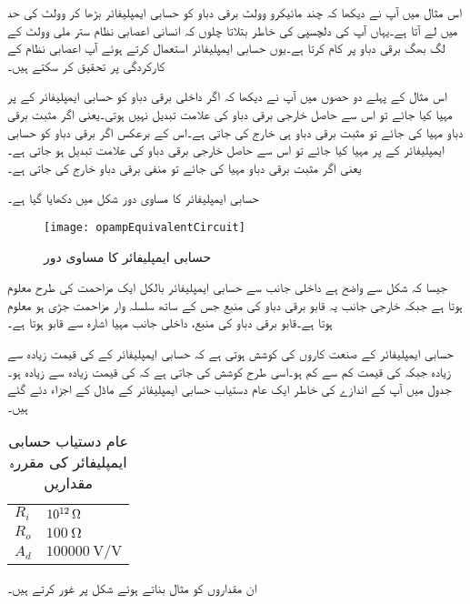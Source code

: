 
	اس مثال میں آپ نے دیکھا کہ چند مائیکرو وولٹ برقی دباو کو حسابی ایمپلیفائر بڑھا کر وولٹ کی حد میں لے آتا ہے۔یہاں آپ کی دلچسپی کی خاطر بتلاتا چلوں کہ انسانی اعصابی نظام  ستر ملی وولٹ  کے لگ بھگ برقی دباو پر کام کرتا ہے۔یوں حسابی ایمپلیفائر استعمال کرتے ہوئے  آپ اعصابی نظام کے کارکردگی پر تحقیق کر سکتے ہیں۔ 

	اس مثال کے پہلے دو حصوں میں آپ نے دیکھا کہ اگر داخلی برقی دباو کو حسابی ایمپلیفائر کے   پر مہیا کیا جائے تو اس سے حاصل خارجی برقی دباو کی علامت تبدیل نہیں ہوتی۔یعنی اگر مثبت برقی دباو مہیا کی جائے تو مثبت برقی دباو ہی خارج کی جاتی ہے۔اس کے برعکس اگر برقی دباو کو حسابی ایمپلیفائر کے   پر مہیا کیا جائے تو اس سے حاصل خارجی برقی دباو کی علامت تبدیل ہو جاتی ہے۔یعنی اگر مثبت برقی دباو مہیا کی جائے تو منفی برقی دباو خارج کی جاتی ہے۔

حسابی ایمپلیفائر کا مساوی دور شکل  میں دکھایا گیا ہے۔
\begin{figure}
\centering
\texttt{[image: opampEquivalentCircuit]}
\caption{حسابی ایمپلیفائر کا مساوی دور}
\label{شکل_حسابی_ایمپلیفائر_کا_مساوی_دور}
\end{figure}
جیسا کہ شکل سے واضح ہے داخلی جانب سے حسابی ایمپلیفائر بالکل ایک مزاحمت  کی طرح معلوم ہوتا ہے جبکہ خارجی جانب  یہ  قابو برقی دباو کی منبع  جس کے ساتھ سلسلہ وار مزاحمت  جڑی ہو معلوم ہوتا ہے۔قابو برقی دباو کی منبع، داخلی جانب مہیا اشارہ سے قابو ہوتا ہے۔

	حسابی ایمپلیفائر کے صنعت کاروں کی کوشش ہوتی ہے کہ حسابی ایمپلیفائر کے   کی قیمت زیادہ سے زیادہ جبکہ    کی قیمت کم سے کم ہو۔اسی طرح کوشش کی جاتی ہے کہ    کی قیمت زیادہ سے زیادہ ہو۔جدول  میں آپ کے اندازے کی خاطر ایک عام دستیاب حسابی ایمپلیفائر کے  ماڈل کے اجزاء دئے گئے ہیں۔
\begin{table}[ht]
\caption{عام دستیاب حسابی ایمپلیفائر کی مقررہ مقداریں}
\label{جدول_حسابی_ایمپلیفائر_عمومی_مقداریں}
\centering
\begin{tabular}{l l}
\toprule
$R_i$ &  $\SI{e{12}}{\ohm}$ \\
$R_o$ & $\SI{100}{\ohm}$\\
$A_d$  & $\SI[per=frac,fraction=nice]{100000}{\volt \per \volt}$ \\
\bottomrule
\end{tabular}
\end{table}
ان مقداروں کو مثال بناتے ہوئے شکل  پر غور کرتے ہیں۔


